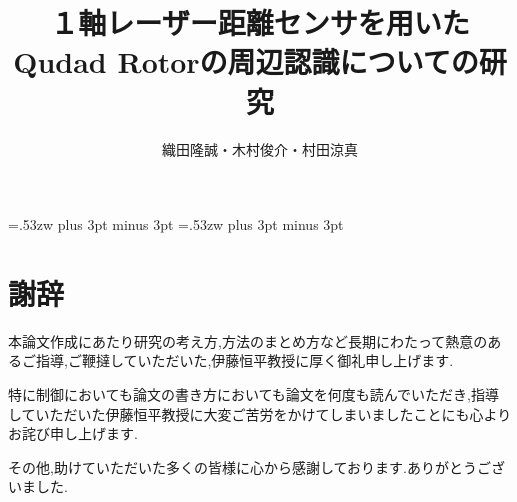 \documentclass[12pt,oneside]{paper}
\title{１軸レーザー距離センサを用いたQudad Rotorの周辺認識についての研究}
\author{織田隆誠・木村俊介・村田涼真}
\begin{document}
\setlength{\baselineskip}{9truemm}

\kanjiskip=.53zw plus 3pt minus 3pt
\xkanjiskip=.53zw plus 3pt minus 3pt

\tableofcontents

















\chapter*{謝辞}
本論文作成にあたり研究の考え方,方法のまとめ方など長期にわたって熱意のあるご指導,ご鞭撻していただいた,伊藤恒平教授に厚く御礼申し上げます.

特に制御においても論文の書き方においても論文を何度も読んでいただき,指導していただいた伊藤恒平教授に大変ご苦労をかけてしまいましたことにも心よりお詫び申し上げます.

その他,助けていただいた多くの皆様に心から感謝しております.ありがとうございました.
\end{document}
